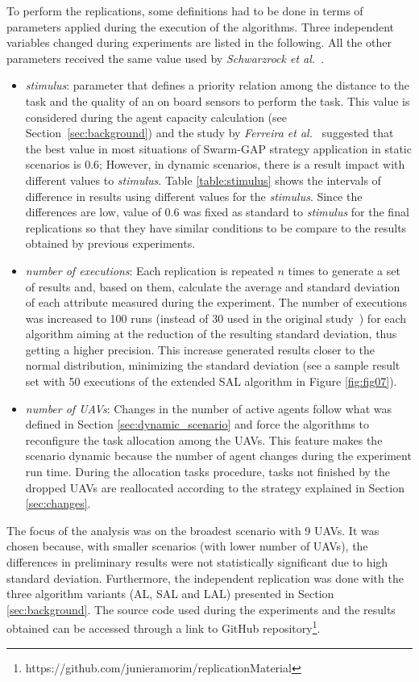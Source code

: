 To perform the replications, some definitions had to be done in terms of parameters applied during the execution of the algorithms. Three independent variables changed during experiments are listed in the following. All the other parameters received the same value used by \textit{Schwarzrock et al.}~\citep{MAS07}.
\begin{itemize}
   \item \textit{stimulus}: parameter that defines a priority relation among the distance to the task and the quality of an on board sensors to perform the task. This value is considered during the agent capacity calculation (see Section~\ref{sec:background}) and the study by \textit{Ferreira et al.}~\citep{ferreira2010robocup} suggested that the best value in most situations of Swarm-GAP strategy application in static scenarios is $0.6$; However, in dynamic scenarios, there is a result impact with different values to \textit{stimulus}. Table \ref{table:stimulus} shows the intervals of difference in results using different values for the \textit{stimulus}. Since the differences are low, value of $0.6$ was fixed as standard to \textit{stimulus} for the final replications so that they have similar conditions to be compare to the results obtained by previous experiments.
   \item \textit{number of executions}: Each replication is repeated $n$ times to generate a set of results and, based on them, calculate the average and standard deviation of each attribute measured during the experiment. The number of executions was increased to 100 runs (instead of 30 used in the original study~\citep{MAS07}) for each algorithm aiming at the reduction of the resulting standard deviation, thus getting a higher precision. This increase generated results closer to the normal distribution, minimizing the standard deviation (see a sample result set with 50 executions of the extended SAL algorithm in Figure \ref{fig:fig07}).
   \item \textit{number of UAVs}: Changes in the number of active agents follow what was defined in Section \ref{sec:dynamic_scenario} and force the algorithms to reconfigure the task allocation among the UAVs. This feature makes the scenario dynamic because the number of agent changes during the experiment run time. During the allocation tasks procedure, tasks not finished by the dropped UAVs are reallocated according to the strategy explained in Section \ref{sec:changes}.
\end{itemize}

The focus of the analysis was on the broadest scenario with 9 UAVs. It was chosen because, with smaller scenarios (with lower number of UAVs), the differences in preliminary results were not statistically significant due to high standard deviation. Furthermore, the independent replication was done with the three algorithm variants (AL, SAL and LAL) presented in Section \ref{sec:background}. The source code used during the experiments and the results obtained can be accessed through a link to GitHub repository\footnote{https://github.com/junieramorim/replicationMaterial}.


